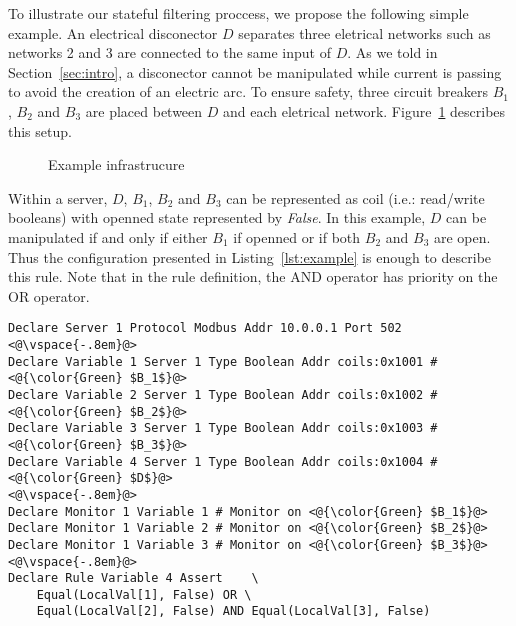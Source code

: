 To illustrate our stateful filtering proccess, we propose the following simple
example.
An electrical disconector $D$ separates three eletrical networks such as
networks 2 and 3 are connected to the same input of $D$.
As we told in Section~\ref{sec:intro}, a disconector cannot be manipulated while
current is passing to avoid the creation of an electric arc.
To ensure safety, three circuit breakers $B_1$, $B_2$ and $B_3$ are placed
between $D$ and each eletrical network.
Figure~\ref{fig:example} describes this setup.

\begin{figure}[htb]
    \centering
    \resizebox{.5\textwidth}{!}{
        
    }
    \caption{Example infrastrucure}
    \label{fig:example}
\end{figure}

Within a \modbus server, $D$, $B_1$, $B_2$ and $B_3$ can be represented as coil
(i.e.: read/write booleans) with openned state represented by {\em False}.
In this example, $D$ can be manipulated if and only if either $B_1$ if openned
or if both $B_2$ and $B_3$ are open.
Thus the configuration presented in Listing~\ref{lst:example} is enough to
describe this rule.
Note that in the rule definition, the AND operator has priority on the OR
operator.

\begin{lstlisting}[label=lst:example,caption=Example configuration]
Declare Server 1 Protocol Modbus Addr 10.0.0.1 Port 502
<@\vspace{-.8em}@>
Declare Variable 1 Server 1 Type Boolean Addr coils:0x1001 # <@{\color{Green} $B_1$}@>
Declare Variable 2 Server 1 Type Boolean Addr coils:0x1002 # <@{\color{Green} $B_2$}@>
Declare Variable 3 Server 1 Type Boolean Addr coils:0x1003 # <@{\color{Green} $B_3$}@>
Declare Variable 4 Server 1 Type Boolean Addr coils:0x1004 # <@{\color{Green} $D$}@>
<@\vspace{-.8em}@>
Declare Monitor 1 Variable 1 # Monitor on <@{\color{Green} $B_1$}@>
Declare Monitor 1 Variable 2 # Monitor on <@{\color{Green} $B_2$}@>
Declare Monitor 1 Variable 3 # Monitor on <@{\color{Green} $B_3$}@>
<@\vspace{-.8em}@>
Declare Rule Variable 4 Assert    \
    Equal(LocalVal[1], False) OR \
    Equal(LocalVal[2], False) AND Equal(LocalVal[3], False)
\end{lstlisting}
